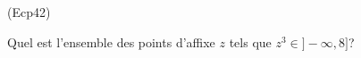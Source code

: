 \begin{tiny}(Ecp42)\end{tiny} Quel est l'ensemble des points d'affixe $z$ tels que $z^3 \in ]-\infty , 8]$? 